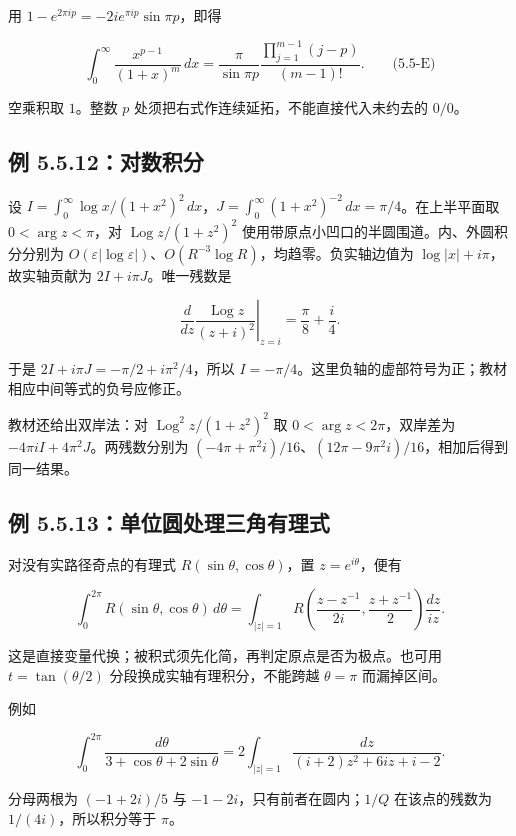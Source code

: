 \documentclass[11pt,a4paper]{article}
\begin{document}
用 \(1-e^{2\pi ip}=-2ie^{\pi ip}\sin\pi p\)，即得

\[
\int_0^\infty\frac{x^{p-1}}{(1+x)^m}\,dx
=\frac{\pi}{\sin\pi p}\frac{\prod_{j=1}^{m-1}(j-p)}{(m-1)!}.
\qquad\text{(5.5-E)}
\]

空乘积取 \(1\)。整数 \(p\) 处须把右式作连续延拓，不能直接代入未约去的
\(0/0\)。

\subsection{例 5.5.12：对数积分}\label{ch05-s5-heading-8}

设
\(I=\int_0^\infty\log x/(1+x^2)^2\,dx\)，\(J=\int_0^\infty(1+x^2)^{-2}\,dx=\pi/4\)。在上半平面取
\(0<\arg z<\pi\)，对 \(\operatorname{Log} z/(1+z^2)^2\)
使用带原点小凹口的半圆围道。内、外圆积分分别为
\(O(\varepsilon|\log\varepsilon|)\)、\(O(R^{-3}\log R)\)，均趋零。负实轴边值为
\(\log|x|+i\pi\)，故实轴贡献为 \(2I+i\pi J\)。唯一残数是

\[
\left.\frac d{dz}\frac{\operatorname{Log} z}{(z+i)^2}\right|_{z=i}
=\frac{\pi}{8}+\frac i4.
\]

于是 \(2I+i\pi J=-\pi/2+i\pi^2/4\)，所以
\(I=-\pi/4\)。这里负轴的虚部符号为正；教材相应中间等式的负号应修正。

教材还给出双岸法：对 \(\operatorname{Log}^2z/(1+z^2)^2\) 取
\(0<\arg z<2\pi\)，双岸差为 \(-4\pi iI+4\pi^2J\)。两残数分别为
\((-4\pi+\pi^2i)/16\)、\((12\pi-9\pi^2i)/16\)，相加后得到同一结果。

\subsection{例 5.5.13：单位圆处理三角有理式}\label{ch05-s5-heading-9}

对没有实路径奇点的有理式 \(R(\sin\theta,\cos\theta)\)，置
\(z=e^{i\theta}\)，便有

\[
\int_0^{2\pi}R(\sin\theta,\cos\theta)\,d\theta
=\int_{|z|=1}R\left(\frac{z-z^{-1}}{2i},\frac{z+z^{-1}}2\right)\frac{dz}{iz}.
\]

这是直接变量代换；被积式须先化简，再判定原点是否为极点。也可用
\(t=\tan(\theta/2)\) 分段换成实轴有理积分，不能跨越 \(\theta=\pi\)
而漏掉区间。

例如

\[
\int_0^{2\pi}\frac{d\theta}{3+\cos\theta+2\sin\theta}
=2\int_{|z|=1}\frac{dz}{(i+2)z^2+6iz+i-2}.
\]

分母两根为 \((-1+2i)/5\) 与 \(-1-2i\)，只有前者在圆内；\(1/Q\)
在该点的残数为 \(1/(4i)\)，所以积分等于 \(\pi\)。
\end{document}
